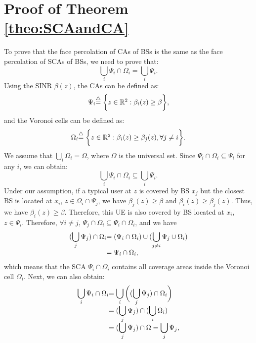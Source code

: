 \documentclass[final]{IEEEtran}
\begin{document}
\section{Proof of Theorem \ref{theo:SCAandCA}}\label{app:SCAandCA}
To prove that the face percolation of CAs of BSs is the same as the face percolation of SCAs of BSs, we need to prove that:
\begin{equation}
\bigcup\limits_{i}\Psi_i\cap\Omega_i=\bigcup\limits_{i}\Psi_i.
\end{equation}
Using the SINR $\beta(z)$, the CAs can be defined as:
\begin{equation}
\begin{array}{r@{}l}
    \Psi_i
    &\overset{\triangle}{=}\bigg\{z\in\mathbb{R}^2:\beta_i(z)\geq\beta\bigg\},
\end{array}
\end{equation}
and the Voronoi cells can be defined as:
\begin{equation}
\begin{array}{r@{}l}
    \Omega_i
    &\overset{\triangle}{=}\bigg\{z\in\mathbb{R}^2:\beta_i(z)\geq\beta_j(z),\forall j\neq i\bigg\}.
\end{array}
\end{equation}
 We assume that $\bigcup_i \Omega_i=\Omega$, where  $\Omega$ is the universal set. Since $\Psi_i\cap \Omega_i \subseteq \Psi_i$ for any $i$, we can obtain:
\begin{equation}
    \bigcup_i \Psi_i\cap \Omega_i \subseteq \bigcup_i \Psi_i.
\end{equation}
Under our assumption, if a typical user at $z$ is covered by BS $x_j$ but  the closest BS is located at $x_i$, $z\in \Omega_i\cap\Psi_j$, we have $\beta_j(z)\geq \beta$ and $\beta_i(z)\geq \beta_j(z)$. Thus,  we have $\beta_i(z)\geq\beta$. Therefore, this UE is also covered by BS located at $x_i$, \ie $z\in\Psi_i$. Therefore, $\forall i\neq j$, $\Psi_j\cap \Omega_i\subseteq\Psi_i\cap\Omega_i$, and we have
\begin{equation}
\begin{array}{r@{}l}
    \displaystyle(\bigcup_j \Psi_j)\cap \Omega_i&\displaystyle=(\Psi_i\cap\Omega_i)\cup(\bigcup_{j\neq i}\Psi_j\cup\Omega_i)\\
    &=\Psi_i\cap\Omega_i,
\end{array}
\end{equation}
which means that the SCA $\Psi_i\cap\Omega_i$ contains all coverage areas inside the Voronoi cell $\Omega_i$. Next, we can also obtain:
\begin{equation}
\begin{array}{r@{}l}
    \displaystyle\bigcup_{i}\Psi_i\cap\Omega_i&\displaystyle=\bigcup_{i}\bigg((\bigcup_j \Psi_j)\cap \Omega_i\bigg)\\
    &\displaystyle=(\bigcup_j \Psi_j)\cap(\bigcup_{i}\Omega_i)\\
    &\displaystyle=(\bigcup_j \Psi_j)\cap\Omega\displaystyle=\bigcup_j \Psi_j,
\end{array}
\end{equation}
\end{document}
